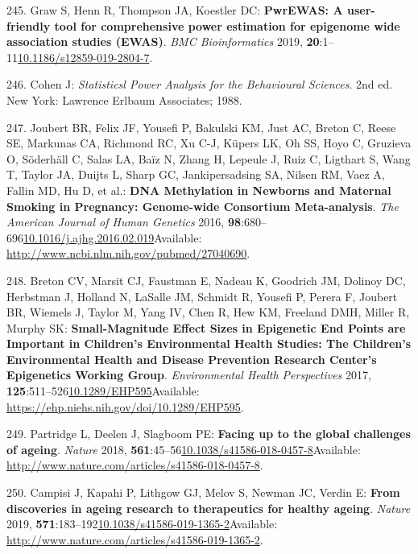 \documentclass[
]{book}
\begin{document}
\leavevmode\hypertarget{ref-Graw2019}{}%
245. Graw S, Henn R, Thompson JA, Koestler DC: \textbf{PwrEWAS: A user-friendly tool for comprehensive power estimation for epigenome wide association studies (EWAS)}. \emph{BMC Bioinformatics} 2019, \textbf{20}:1--11\href{https://doi.org/10.1186/s12859-019-2804-7}{10.1186/s12859-019-2804-7}.

\leavevmode\hypertarget{ref-Cohen1988}{}%
246. Cohen J: \emph{Statisticsl Power Analysis for the Behavioural Sciences}. 2nd ed. New York: Lawrence Erlbaum Associates; 1988.

\leavevmode\hypertarget{ref-Joubert2016}{}%
247. Joubert BR, Felix JF, Yousefi P, Bakulski KM, Just AC, Breton C, Reese SE, Markunas CA, Richmond RC, Xu C-J, Küpers LK, Oh SS, Hoyo C, Gruzieva O, Söderhäll C, Salas LA, Baïz N, Zhang H, Lepeule J, Ruiz C, Ligthart S, Wang T, Taylor JA, Duijts L, Sharp GC, Jankipersadsing SA, Nilsen RM, Vaez A, Fallin MD, Hu D, et al.: \textbf{DNA Methylation in Newborns and Maternal Smoking in Pregnancy: Genome-wide Consortium Meta-analysis}. \emph{The American Journal of Human Genetics} 2016, \textbf{98}:680--696\href{https://doi.org/10.1016/j.ajhg.2016.02.019}{10.1016/j.ajhg.2016.02.019}Available: \url{http://www.ncbi.nlm.nih.gov/pubmed/27040690}.

\leavevmode\hypertarget{ref-Breton2017}{}%
248. Breton CV, Marsit CJ, Faustman E, Nadeau K, Goodrich JM, Dolinoy DC, Herbstman J, Holland N, LaSalle JM, Schmidt R, Yousefi P, Perera F, Joubert BR, Wiemels J, Taylor M, Yang IV, Chen R, Hew KM, Freeland DMH, Miller R, Murphy SK: \textbf{Small-Magnitude Effect Sizes in Epigenetic End Points are Important in Children's Environmental Health Studies: The Children's Environmental Health and Disease Prevention Research Center's Epigenetics Working Group}. \emph{Environmental Health Perspectives} 2017, \textbf{125}:511--526\href{https://doi.org/10.1289/EHP595}{10.1289/EHP595}Available: \url{https://ehp.niehs.nih.gov/doi/10.1289/EHP595}.

\leavevmode\hypertarget{ref-Partridge2018}{}%
249. Partridge L, Deelen J, Slagboom PE: \textbf{Facing up to the global challenges of ageing}. \emph{Nature} 2018, \textbf{561}:45--56\href{https://doi.org/10.1038/s41586-018-0457-8}{10.1038/s41586-018-0457-8}Available: \url{http://www.nature.com/articles/s41586-018-0457-8}.

\leavevmode\hypertarget{ref-Campisi2019}{}%
250. Campisi J, Kapahi P, Lithgow GJ, Melov S, Newman JC, Verdin E: \textbf{From discoveries in ageing research to therapeutics for healthy ageing}. \emph{Nature} 2019, \textbf{571}:183--192\href{https://doi.org/10.1038/s41586-019-1365-2}{10.1038/s41586-019-1365-2}Available: \url{http://www.nature.com/articles/s41586-019-1365-2}.
\end{document}
